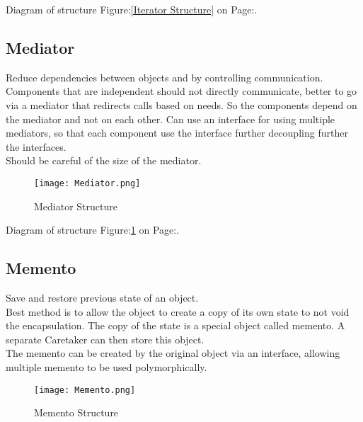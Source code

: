 \documentclass[11pt]{scrartcl} %
\begin{document}
Diagram of structure Figure:\ref{Iterator Structure} on Page:\pageref{Iterator Structure}.

\subsection{Mediator}

Reduce dependencies between objects and by controlling communication.\\

Components that are independent should not directly communicate, better to go via a mediator that redirects calls
based on needs. So the components depend on the mediator and not on each other. Can use an interface for using
multiple mediators, so that each component use the interface further decoupling further the interfaces.\\

Should be careful of the size of the mediator.\\

\begin{figure}[h] %
	\centering
	\texttt{[image: Mediator.png]} %
	\caption{Mediator Structure}
	\label{Mediator Structure}
\end{figure}

Diagram of structure Figure:\ref{Mediator Structure} on Page:\pageref{Mediator Structure}.

\subsection{Memento}

Save and restore previous state of an object.\\

Best method is to allow the object to create a copy of its own state to not void the encapsulation. The copy of the state
is a special object called memento. A separate Caretaker can then store this object.\\

The memento can be created by the original object via an interface, allowing multiple memento to be used polymorphically.\\

\begin{figure}[h] %
	\centering
	\texttt{[image: Memento.png]} %
	\caption{Memento Structure}
	\label{Memento Structure}
\end{figure}
\end{document}

